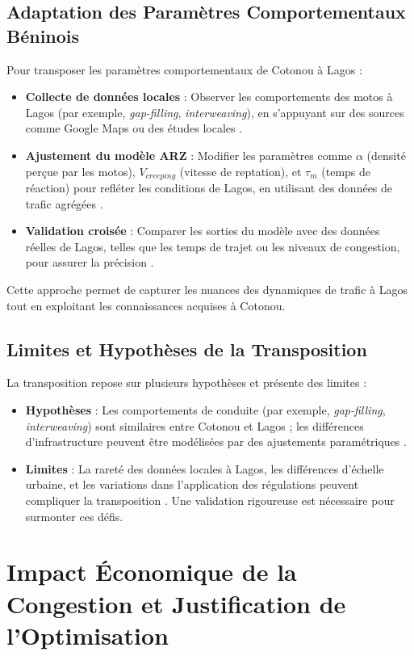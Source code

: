 \subsection{Adaptation des Paramètres Comportementaux Béninois}
Pour transposer les paramètres comportementaux de Cotonou à Lagos :
\begin{itemize}
    \item \textbf{Collecte de données locales} : Observer les comportements des motos à Lagos (par exemple, \textit{gap-filling}, \textit{interweaving}), en s'appuyant sur des sources comme Google Maps ou des études locales \cite{ludi2020traffic}.
    \item \textbf{Ajustement du modèle ARZ} : Modifier les paramètres comme \(\alpha\) (densité perçue par les motos), \(V_{creeping}\) (vitesse de reptation), et \(\tau_m\) (temps de réaction) pour refléter les conditions de Lagos, en utilisant des données de trafic agrégées \cite{yoon2020design}.
    \item \textbf{Validation croisée} : Comparer les sorties du modèle avec des données réelles de Lagos, telles que les temps de trajet ou les niveaux de congestion, pour assurer la précision \cite{imoh2025analysis}.
\end{itemize}
Cette approche permet de capturer les nuances des dynamiques de trafic à Lagos tout en exploitant les connaissances acquises à Cotonou.

\subsection{Limites et Hypothèses de la Transposition}
La transposition repose sur plusieurs hypothèses et présente des limites :
\begin{itemize}
    \item \textbf{Hypothèses} : Les comportements de conduite (par exemple, \textit{gap-filling}, \textit{interweaving}) sont similaires entre Cotonou et Lagos ; les différences d'infrastructure peuvent être modélisées par des ajustements paramétriques \cite{kumar2011urban}.
    \item \textbf{Limites} : La rareté des données locales à Lagos, les différences d'échelle urbaine, et les variations dans l'application des régulations peuvent compliquer la transposition \cite{imoh2025analysis}. Une validation rigoureuse est nécessaire pour surmonter ces défis.
\end{itemize}

\section{Impact Économique de la Congestion et Justification de l'Optimisation}
\label{sec:impact_economique_justification}

